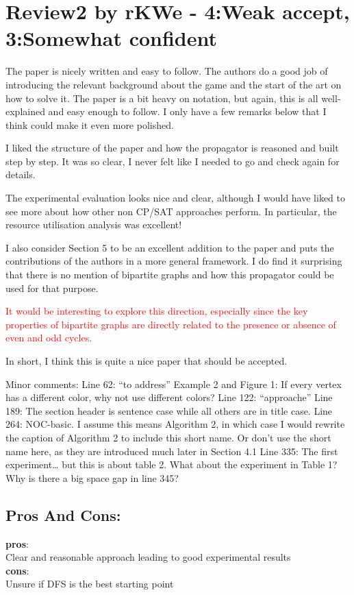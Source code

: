 \documentclass{article}
\begin{document}
\section*{Review2 by rKWe - 4:Weak accept,  3:Somewhat confident }
The paper is nicely written and easy to follow. The authors do a good job of introducing the relevant background about the game and the start of the art on how to solve it. The paper is a bit heavy on notation, but again, this is all well-explained and easy enough to follow. I only have a few remarks below that I think could make it even more polished.

I liked the structure of the paper and how the propagator is reasoned and built step by step. It was so clear, I never felt like I needed to go and check again for details.

The experimental evaluation looks nice and clear, although I would have liked to see more about how other non CP/SAT approaches perform. In particular, the resource utilisation analysis was excellent!

I also consider Section 5 to be an excellent addition to the paper and puts the contributions of the authors in a more general framework. I do find it surprising that there is no mention of bipartite graphs and how this propagator could be used for that purpose.

\textcolor{red}{It would be interesting to explore this direction, especially since the key properties of bipartite graphs are directly related to the presence or absence of even and odd cycles.}

In short, I think this is quite a nice paper that should be accepted.

Minor comments: Line 62: “to address” Example 2 and Figure 1: If every vertex has a different color, why not use different colors? Line 122: “approache” Line 189: The section header is sentence case while all others are in title case. Line 264: NOC-basic. I assume this means Algorithm 2, in which case I would rewrite the caption of Algorithm 2 to include this short name. Or don’t use the short name here, as they are introduced much later in Section 4.1 Line 335: The first experiment… but this is about table 2. What about the experiment in Table 1? Why is there a big space gap in line 345?

\subsection*{Pros And Cons:}
\textbf{pros}:\\
Clear and reasonable approach leading to good experimental results\\
\textbf{cons}:\\
Unsure if DFS is the best starting point
\end{document}
